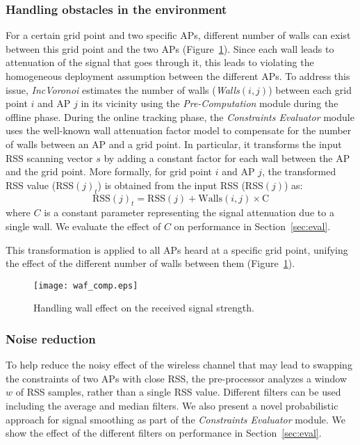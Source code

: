 \documentclass[conference]{IEEEtran}
\def \sys {\textit{IncVoronoi}}
\begin{document}
\subsubsection{Handling obstacles in the environment}\label{sec:waf}
For a certain grid point and two specific APs, different number of walls can exist between this grid point and the two APs (Figure~\ref{fig:WAF_comp}). Since each wall leads to attenuation of the signal that goes through it, this leads to violating the homogeneous deployment assumption between the different APs. To address this issue, \sys{} estimates the number of walls (\emph{Walls}$(i, j)$) between each grid point $i$ and AP $j$ in its vicinity using the \emph{Pre-Computation} module during the offline phase. During the online tracking phase, the \emph{Constraints Evaluator} module uses the well-known wall attenuation factor model \cite{RADAR00} to compensate for the number of walls between an AP and a grid point. In particular, it transforms the input RSS scanning vector $s$ by adding a constant factor for each wall between the AP and the grid point. More formally, for grid point $i$ and AP $j$, the transformed RSS value (RSS$(j)_t$) is obtained from the input RSS (RSS$(j)$) as:
\begin{equation}
  \textrm{RSS}(j)_t=  \textrm{RSS}(j)+ \textrm{Walls}(i, j)\times \textrm{C}
\end{equation}
where $C$ is a constant parameter representing the signal attenuation due to a single wall. We evaluate the effect of $C$ on performance in Section~\ref{sec:eval}.

This transformation is applied to all APs heard at a specific grid point, unifying the effect of the different number of walls between them (Figure~\ref{fig:WAF_comp}).

\begin{figure}[!t]
\centering
\texttt{[image: waf\_comp.eps]}
\caption{Handling wall effect on the received signal strength.
}
\label{fig:WAF_comp}
\end{figure}

\subsubsection{Noise reduction}
\label{sec:noise}

To help reduce the noisy effect of the wireless channel that may lead to swapping the constraints of two APs with close RSS, the pre-processor analyzes a window $w$ of RSS samples, rather than a single RSS value. Different filters can be used including the average and median filters. We also present a novel probabilistic approach for signal smoothing as part of the \emph{Constraints Evaluator} module. 
We show the effect of the different filters on performance in Section~\ref{sec:eval}.
\end{document}
